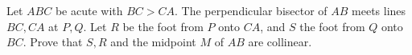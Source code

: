 Let $ABC$ be acute with $BC>CA$. The perpendicular bisector of $AB$ meets lines $BC,CA$ at $P,Q$. Let $R$ be the foot from $P$ onto $CA$, and $S$ the foot from $Q$ onto $BC$. Prove that $S,R$ and the midpoint $M$ of $AB$ are collinear.
